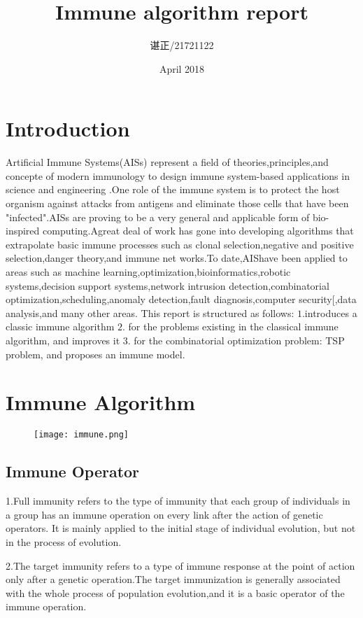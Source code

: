 \documentclass{article}
\title{Immune algorithm report}
\author{\begin{CJK*}{UTF8}{gbsn}
谌正/21721122\end{CJK*} }
\date{April 2018}
\begin{document}
\maketitle


\section{Introduction}
Artificial Immune Systems(AISs) represent a field of theories,principles,and concepte of modern immunology to design immune system-based applications in science and engineering \citep{a14}.One role of the immune system is to protect the host organism against attacks from antigens and eliminate those cells that have been "infected".AISs are proving to be a very general and applicable form of bio-inspired computing.Agreat deal of work has gone into developing algorithms that extrapolate basic immune processes such as clonal selection,negative and positive selection,danger theory,and immune net works\citep{a2}.To date,AIShave been applied to areas such as machine learning\citep{a3},optimization\citep{a4},bioinformatics\citep{a5},robotic systems\citep{a6},decision support systems\citep{a7},network intrusion detection\citep{a8},combinatorial optimization\citep{a9},scheduling\citep{a10},anomaly detection\citep{a11},fault diagnosis\citep{a12},computer security[\citep{a13},data analysis\citep{a1},and many other areas.
This report is structured as follows: 
\newline
$1$.introduces a classic immune algorithm 
\newline
$2$. for the problems existing in the classical immune algorithm, and improves it 
\newline
$3$. for the combinatorial optimization problem: TSP problem, and proposes an immune model.


\section{Immune Algorithm}
\begin{figure}
\centering
\texttt{[image: immune.png]}
\end{figure}
\subsection{Immune Operator}
\indent

 \par\setlength\parindent{1em}
   1.Full immunity refers to the type of immunity that each group of individuals in a group has an immune operation on every link after the action of genetic operators. It is mainly applied to the initial stage of individual evolution, but not in the process of evolution.
   \par\setlength\parindent{1em}
   2.The target immunity refers to a type of immune response at the point of action only after a genetic operation.The target immunization is generally associated with the whole process of population evolution,and it is a basic operator of the immune operation.
  
\end{document}
